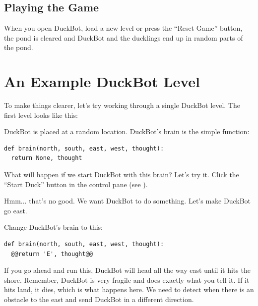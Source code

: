 \subsection{Playing the Game}

When you open DuckBot, load a new level or press the ``Reset Game'' button, the pond is cleared and
DuckBot and the ducklings end up in random parts of the pond.

\section{An Example DuckBot Level}

To make things clearer, let's try working through a single DuckBot level. The first level looks like
this:


DuckBot is placed at a random location. DuckBot's brain is the simple function:

\begin{lstlisting}
def brain(north, south, east, west, thought):
  return None, thought
\end{lstlisting}

What will happen if we start DuckBot with this brain? Let's try it. Click the ``Start Duck'' button
in the control pane (see ). 

Hmm... that's no good. We want DuckBot to do something. Let's make DuckBot go east.

\begin{TryThisBox}
  Change DuckBot's brain to this:
  \begin{lstlisting}
def brain(north, south, east, west, thought):
  @@return 'E', thought@@
  \end{lstlisting}
\end{TryThisBox}

If you go ahead and run this, DuckBot will head all the way east until it hits the shore. Remember,
DuckBot is very fragile and does exactly what you tell it. If it hits land, it dies, which is what
happens here. We need to detect when there is an obstacle to the east and send DuckBot in a
different direction.

